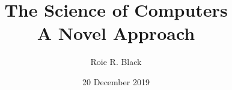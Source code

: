\documentclass[12pt,twoside,titlepage]{book}
\title{
	{The Science of Computers}\\
	{\large A Novel Approach}
}
\author{Roie R. Black}
\date{20 December 2019}
\begin{document}
\maketitle
\graphicspath{{./assets/images/}}


\end{document}
